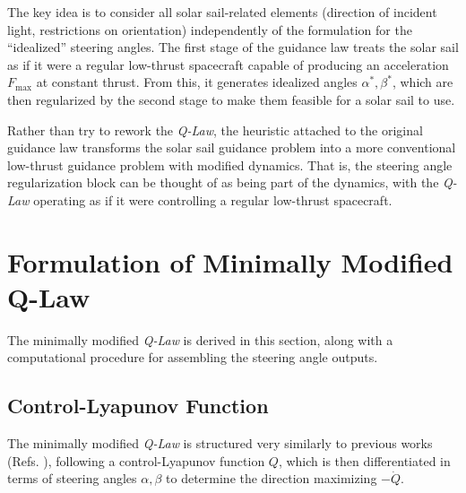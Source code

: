 The key idea is to consider all solar sail-related elements (direction of incident light, restrictions on orientation) independently of the formulation for the ``idealized'' steering angles. The first stage of the guidance law treats the solar sail as if it were a regular low-thrust spacecraft capable of producing an acceleration $F_{\max}$ at constant thrust. From this, it generates idealized angles $\alpha^*, \beta^*$, which are then regularized by the second stage to make them feasible for a solar sail to use.

Rather than try to rework the \textit{Q-Law}, the heuristic attached to the original guidance law transforms the solar sail guidance problem into a more conventional low-thrust guidance problem with modified dynamics. That is, the steering angle regularization block can be thought of as being part of the dynamics, with the \textit{Q-Law} operating as if it were controlling a regular low-thrust spacecraft.

\section{Formulation of Minimally Modified Q-Law}
The minimally modified \textit{Q-Law} is derived in this section, along with a computational procedure for assembling the steering angle outputs.

\subsection{Control-Lyapunov Function}
The minimally modified \textit{Q-Law} is structured very similarly to previous works (Refs. \cite{petropoulos2004low, vargaperez2016, sanjeev2023}), following a control-Lyapunov function $Q$, which is then differentiated in terms of steering angles $\alpha, \beta$ to determine the direction maximizing $-\dot{Q}$.

